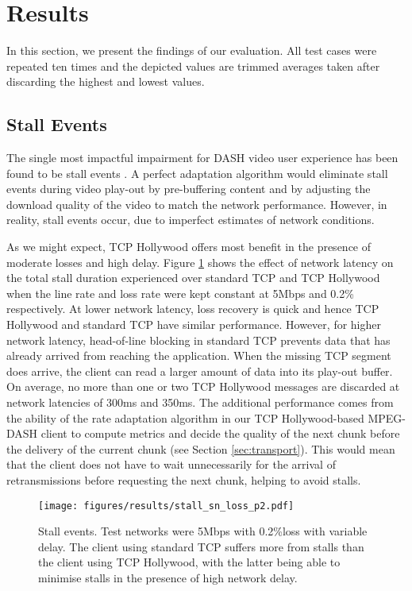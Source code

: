 \section{Results}
\label{sec:testing} 

In this section, we present the findings of our evaluation. All test cases were repeated
ten times and the depicted values are trimmed averages taken after discarding the highest
and lowest values. 

\subsection{Stall Events}
\label{sec:testing-stall}

The single most impactful impairment for DASH video user experience has been found to be
stall events \cite{hossfeld2011quantification}. A perfect adaptation algorithm would
eliminate stall events during video play-out by pre-buffering content and by adjusting the
download quality of the video to match the network performance. However, in reality, stall
events occur, due to imperfect estimates of network conditions.

As we might expect, TCP Hollywood offers most benefit in the presence of moderate losses and high
delay. Figure \ref{fig:stall_delay2} shows the effect of network latency on the total
stall duration experienced over standard TCP and TCP Hollywood when the line rate and loss
rate were kept constant at 5Mbps and 0.2\% respectively. At lower network latency, loss
recovery is quick and hence TCP Hollywood and standard TCP have similar performance.
However, for higher network latency, head-of-line blocking in standard TCP prevents data
that has already arrived from reaching the application. When the missing TCP segment does
arrive, the client can read a larger amount of data into its play-out buffer. On average,
no more than one or two TCP Hollywood messages are discarded at network latencies of 300ms and
350ms. The additional performance comes from the ability of the rate adaptation algorithm in 
our TCP Hollywood-based MPEG-DASH client to compute metrics and decide the quality of the 
next chunk before the delivery of the current chunk (see Section \ref{sec:transport}). 
This would mean that the client does not have to wait unnecessarily for the arrival of 
retransmissions before requesting the next chunk, helping to avoid stalls.

\begin{figure}
  \centering
  \texttt{[image: figures/results/stall\_sn\_loss\_p2.pdf]}
  \caption{Stall events. Test networks were 5Mbps with 0.2\%loss with variable delay. The 
           client using standard TCP suffers more from stalls than the client using TCP Hollywood, 
           with the latter being able to minimise stalls in the presence of high network delay.}
  \label{fig:stall_delay2}
\end{figure}

